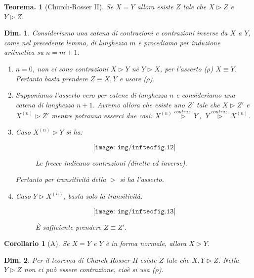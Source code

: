 \documentclass{book}
\newtheorem{teorema}{Teorema.}[chapter]
\newtheorem{dimostrazione}{Dim.}[chapter]
\newtheorem{corollario}{Corollario}[chapter]
\begin{document}
\begin{teorema}[Church-Rosser II]
Se $X = Y$ allora esiste $Z$ tale che $X \vartriangleright Z$ e $Y
\vartriangleright Z$.
\end{teorema}

\begin{dimostrazione}
Consideriamo una catena di contrazioni e contrazioni inverse da $X$ a $Y$,
come nel precedente lemma, di lunghezza $m$ e procediamo per induzione
aritmetica su $n = m+1$.
\begin{enumerate}
  \item[$\bullet$]$n = 0$, non ci sono contrazioni $X \vartriangleright Y$ n\`e
    $Y \vartriangleright X$, per l'asserto ($\rho$) $X \equiv Y$. Pertanto
    basta prendere $Z \equiv X, Y$ e usare ($\rho$).
  \item[$\bullet$]Supponiamo l'asserto vero per catene di lunghezza $n$ e
    consideriamo una catena di lunghezza $n+1$.
    Avremo allora che esiste uno $Z'$ tale che $X \vartriangleright Z'$ e
    $X^{(n)} \vartriangleright Z'$ mentre potranno esserci due casi: $X^{(n)}
    \stackrel{contraz.}{\vartriangleright} Y\ $, $\ Y
    \stackrel{contraz.}{\vartriangleright} X^{(n)}$.

  \item[-]Caso $X^{(n)} \vartriangleright Y$ si ha:
  \begin{figure}[!ht]
    \[ \texttt{[image: img/infteofig.12]} \]
    \caption{Le frecce indicano contrazioni (dirette ed inverse).}
  \end{figure}  

    Pertanto per transitivit\`a della $\vartriangleright$ si ha l'asserto.

  \item[-]Caso $Y \vartriangleright X^{(n)}$,
    basta solo la transitivit\`a:
  \begin{figure}[!ht]
    \[ \texttt{[image: img/infteofig.13]} \]
    \caption{\`E sufficiente prendere $Z \equiv Z'$.}
  \end{figure}  
\end{enumerate}
\end{dimostrazione}

\begin{corollario}[A]
Se $X = Y$ e $Y$ \`e in forma normale, allora $X \vartriangleright Y$.
\end{corollario}

\begin{dimostrazione}
Per il teorema di \emph{Church-Rosser II} esiste $Z$ tale che $X,Y
\vartriangleright Z$. Nella $Y \vartriangleright Z$ non ci pu\`o essere
contrazione, cio\`e si usa ($\rho$).
\end{dimostrazione}
\end{document}
